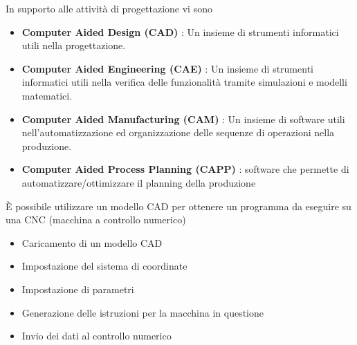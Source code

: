 \documentclass[10pt, letterpaper]{report}
\begin{document}
\acc In supporto alle attività di progettazione vi sono \begin{itemize}
    \item \textbf{Computer Aided Design (CAD)} : Un insieme di strumenti informatici utili nella progettazione. 
    \item \textbf{Computer Aided Engineering (CAE)} : Un insieme di strumenti informatici utili nella verifica 
    delle funzionalità tramite simulazioni e modelli matematici.
    \item \textbf{Computer Aided Manufacturing (CAM)} : Un insieme di software utili nell'automatizzazione ed 
    organizzazione delle sequenze di operazioni nella produzione.  
    \item \textbf{Computer Aided Process Planning (CAPP)} : software che 
    permette di automatizzare/ottimizzare il planning della produzione
\end{itemize}
È possibile utilizzare un modello CAD per ottenere un programma da eseguire su una CNC (macchina a controllo numerico)\begin{itemize}
    \item Caricamento di un modello CAD 
    \item Impostazione del sistema di coordinate 
    \item Impostazione di parametri 
    \item Generazione delle istruzioni per la macchina in questione 
    \item Invio dei dati al controllo numerico
\end{itemize}
\flowerLine 
\end{document}
